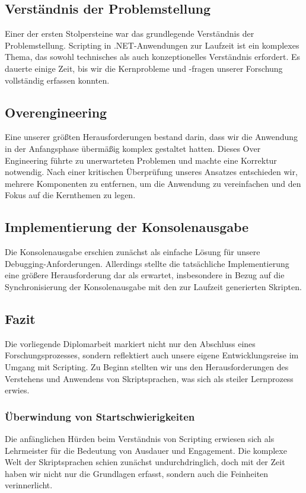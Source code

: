 \subsection*{Verständnis der Problemstellung}
Einer der ersten Stolpersteine war das grundlegende Verständnis der Problemstellung. 
Scripting in .NET-Anwendungen zur Laufzeit ist ein komplexes Thema, das sowohl technisches 
als auch konzeptionelles Verständnis erfordert. Es dauerte einige Zeit, bis wir die 
Kernprobleme und -fragen unserer Forschung vollständig erfassen konnten.

\subsection*{Overengineering}
Eine unserer größten Herausforderungen bestand darin, dass wir die Anwendung in der 
Anfangsphase übermäßig komplex gestaltet hatten. Dieses Over Engineering führte zu 
unerwarteten Problemen und machte eine Korrektur notwendig. Nach einer kritischen 
Überprüfung unseres Ansatzes entschieden wir, mehrere Komponenten zu entfernen, 
um die Anwendung zu vereinfachen und den Fokus auf die Kernthemen zu legen.

\subsection*{Implementierung der Konsolenausgabe}
Die Konsolenausgabe erschien zunächst als einfache Lösung für unsere Debugging-Anforderungen. 
Allerdings stellte die tatsächliche Implementierung eine größere Herausforderung dar als erwartet,
insbesondere in Bezug auf die Synchronisierung der Konsolenausgabe mit den zur Laufzeit 
generierten Skripten.

\newpage
\subsection*{Fazit}
Die vorliegende Diplomarbeit markiert nicht nur den Abschluss eines Forschungsprozesses, 
sondern reflektiert auch unsere eigene Entwicklungsreise im Umgang mit Scripting. Zu Beginn 
stellten wir uns den Herausforderungen des Verstehens und Anwendens von Skriptsprachen, 
was sich als steiler Lernprozess erwies.

\subsubsection*{Überwindung von Startschwierigkeiten}

Die anfänglichen Hürden beim Verständnis von Scripting erwiesen sich als Lehrmeister für 
die Bedeutung von Ausdauer und Engagement. Die komplexe Welt der Skriptsprachen schien 
zunächst undurchdringlich, doch mit der Zeit haben wir nicht nur die Grundlagen erfasst, 
sondern auch die Feinheiten verinnerlicht.

